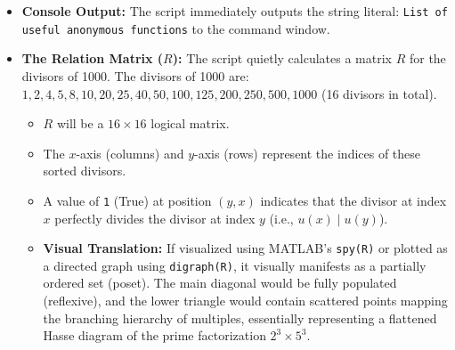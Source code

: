 \begin{itemize}
    \item \textbf{Console Output:} The script immediately outputs the string literal: \texttt{List of useful anonymous functions} to the command window.
    \item \textbf{The Relation Matrix ($R$):} The script quietly calculates a matrix $R$ for the divisors of 1000. The divisors of 1000 are: $1, 2, 4, 5, 8, 10, 20, 25, 40, 50, 100, 125, 200, 250, 500, 1000$ (16 divisors in total). 
    \begin{itemize}
        \item $R$ will be a $16 \times 16$ logical matrix.
        \item The $x$-axis (columns) and $y$-axis (rows) represent the indices of these sorted divisors.
        \item A value of \texttt{1} (True) at position $(y, x)$ indicates that the divisor at index $x$ perfectly divides the divisor at index $y$ (i.e., $u(x) \mid u(y)$).
        \item \textbf{Visual Translation:} If visualized using MATLAB's \texttt{spy(R)} or plotted as a directed graph using \texttt{digraph(R)}, it visually manifests as a partially ordered set (poset). The main diagonal would be fully populated (reflexive), and the lower triangle would contain scattered points mapping the branching hierarchy of multiples, essentially representing a flattened Hasse diagram of the prime factorization $2^3 \times 5^3$.
    \end{itemize}
\end{itemize}
